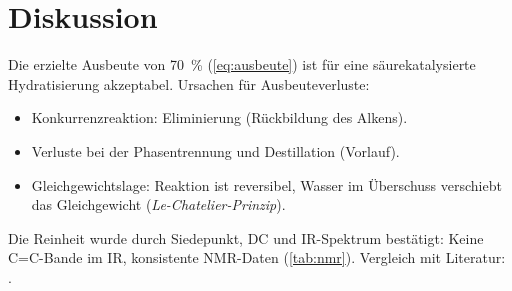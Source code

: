 \section{Diskussion}
\label{sec:diskussion}

Die erzielte Ausbeute von \SI{70}{\percent} (\cref{eq:ausbeute}) ist für
eine säurekatalysierte Hydratisierung akzeptabel. Ursachen für Ausbeuteverluste:
\begin{itemize}
  \item Konkurrenzreaktion: Eliminierung (Rückbildung des Alkens).
  \item Verluste bei der Phasentrennung und Destillation (Vorlauf).
  \item Gleichgewichtslage: Reaktion ist reversibel, Wasser im Überschuss
        verschiebt das Gleichgewicht (\textit{Le-Chatelier-Prinzip}).
\end{itemize}

Die Reinheit wurde durch Siedepunkt, DC und IR-Spektrum bestätigt:
Keine C=C-Bande im IR, konsistente NMR-Daten (\cref{tab:nmr}).
Vergleich mit Literatur: \cite{Example2023}.
